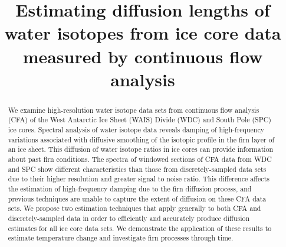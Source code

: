 \documentclass[draft, jgrga]{AGUTeX}
\begin{document}

\title{Estimating diffusion lengths of water isotopes from ice core data measured by continuous flow analysis}









\begin{abstract}

We examine high-resolution water isotope data sets from continuous flow analysis (CFA) of the West Antarctic Ice Sheet (WAIS) Divide (WDC) and South Pole (SPC) ice cores. Spectral analysis of water isotope data reveals damping of high-frequency variations associated with diffusive smoothing of the isotopic profile in the firn layer of an ice sheet. This diffusion of water isotope ratios in ice cores can provide information about past firn conditions. The spectra of windowed sections of CFA data from WDC and SPC show different characteristics than those from discretely-sampled data sets due to their higher resolution and greater signal to noise ratio. This difference affects the estimation of high-frequency damping due to the firn diffusion process, and previous techniques are unable to capture the extent of diffusion on these CFA data sets. We propose two estimation techniques that apply generally to both CFA and discretely-sampled data in order to efficiently and accurately produce diffusion estimates for all ice core data sets. We demonstrate the application of these results to estimate temperature change and investigate firn processes through time.

\end{abstract}
\end{document}
